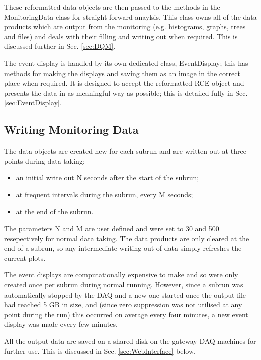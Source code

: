 These reformatted data objects are then passed to the methods in the MonitoringData class for straight forward anaylsis.  This class owns all of the data products which are output from the monitoring (e.g. histograms, graphs, trees and files) and deals with their filling and writing out when required.  This is discussed further in Sec. \ref{sec:DQM}.

The event display is handled by its own dedicated class, EventDisplay; this has methods for making the displays and saving them as an image in the correct place when required.  It is designed to accept the reformatted RCE object and presents the data in as meaningful way as possible; this is detailed fully in Sec. \ref{sec:EventDisplay}.

\subsection{Writing Monitoring Data}\label{sec:WritingMonitoringData}

The data objects are created new for each subrun and are written out at three points during data taking:
\begin{itemize}
\item an initial write out N seconds after the start of the subrun;
\item at frequent intervals during the subrun, every M seconds;
\item at the end of the subrun.
\end{itemize}
The parameters N and M are user defined and were set to 30 and 500 resepectively for normal data taking.  The data products are only cleared at the end of a subrun, so any intermediate writing out of data simply refreshes the current plots.

The event displays are computationally expensive to make and so were only created once per subrun during normal running.  However, since a subrun was automatically stopped by the DAQ and a new one started once the output file had reached 5 GB in size, and (since zero suppression was not utilised at any point during the run) this occurred on average every four minutes, a new event display was made every few minutes.

All the output data are saved on a shared disk on the gateway DAQ machines for further use.  This is discussed in Sec. \ref{sec:WebInterface} below.

